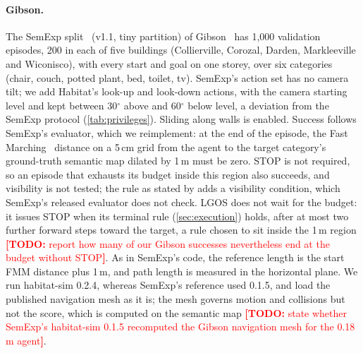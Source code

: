 \documentclass[10pt]{article}
\newcommand{\TODO}[1]{\textcolor{red}{\textbf{[TODO:} #1\textbf{]}}}
\newcommand{\ours}{LGOS\xspace}
\begin{document}
\paragraph{Gibson.} The SemExp split~\citep{chaplot2020object} (v1.1, tiny partition) of Gibson~\citep{xia2018gibson}
has 1,000 validation episodes, 200 in each of five buildings (Collierville, Corozal, Darden, Markleeville and
Wiconisco), with every start and goal on one storey, over six categories (chair, couch, potted plant, bed, toilet,
tv). SemExp's action set has no camera tilt; we add Habitat's look-up and look-down actions, with the camera starting
level and kept between 30$^\circ$ above and 60$^\circ$ below level, a deviation from the SemExp protocol
(\cref{tab:privileges}). Sliding along walls is enabled.
Success follows SemExp's evaluator, which we reimplement: at the end of the episode, the Fast
Marching~\citep{sethian1996fast} distance on a 5\,cm grid from the agent to the target category's ground-truth
semantic map dilated by 1\,m must be zero. STOP is not required, so an episode that exhausts its budget inside this
region also succeeds, and visibility is not tested; the rule as stated by \citet{loo2025open} adds a visibility
condition, which SemExp's released evaluator does not check. \ours does not wait for the budget: it issues STOP when
its terminal rule (\cref{sec:execution}) holds, after at most two further forward steps toward the target, a rule chosen to sit
inside the 1\,m region \TODO{report how many of
our Gibson successes nevertheless end at the budget without STOP}. As in SemExp's code, the reference length is the
start FMM distance plus 1\,m, and path length is measured in the horizontal plane. We run habitat-sim 0.2.4,
whereas SemExp's reference used 0.1.5, and load the published navigation mesh as it is; the mesh governs motion and collisions but not the score, which is computed on the semantic
map \TODO{state whether SemExp's habitat-sim 0.1.5 recomputed the Gibson navigation mesh for the 0.18\,m agent}.
\end{document}

